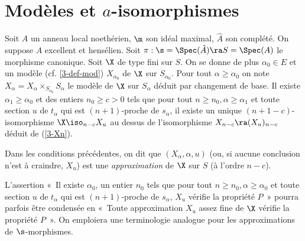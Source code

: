 \documentclass[10pt]{../fichiers-configuration-latex/smfart}
\begin{document}
\section{Modèles et $a$-isomorphismes}
\begin{theoreme}[Approximation]\label{3-theo} Soit $A$  un
anneau local noethérien, $\m$ son idéal maximal, $\hat A$
son complété. On suppose $A$ excellent et hensélien. Soit
$\pi:{\s}=\Spec(\hat A)\ra S=\Spec(A)$ le morphisme canonique. Soit
$\X$ de type fini sur $S$. On se donne de plus $\alpha_0\in E$
et  un modèle (cf. \ref{3-def-mod}) $X_{\alpha_0}$ de $\X$
sur $S_{\alpha_0}$.  Pour tout $\alpha\geq \alpha_0$ on note
$X_\alpha=X_\alpha\times_{S_{\alpha_0}}S_\alpha$ le modèle de
$\X$ sur $S_\alpha$ déduit par changement de base.  Il existe
$\alpha_1\geq\alpha_0$ et des entiers $n_0\geq c>0$ tels que
pour tout $n\geq n_0,\alpha\geq\alpha_1$ et toute section $u$ de
$t_\alpha$ qui est $(n+1)$-proche de $s_\alpha$, il existe un unique
$(n+1-c)$-isomorphisme $\X\iso_{n-c}X_u$ au dessus de l'isomorphisme
$X_{n-c}\ra (X_u)_{n-c}$ déduit de (\ref{3-Xn}).\end{theoreme}


\begin{definition}\label{3-rem} Dans les conditions précédentes,
on dit que $(X_\alpha,\alpha,u)$ (ou, si aucune conclusion n'est
à craindre, $X_u$) est une \emph{approximation} de $\X$ sur $S$
(à l'ordre $n-c$).  \end{definition}

L'assertion « Il existe $\alpha_0$, un entier  $n_0$ tels
que pour tout $n\geq n_0,\alpha\geq\alpha_0$ et toute section
$u$ de $t_\alpha$ qui est $(n+1)$-proche de $s_\alpha$, $X_u$
vérifie la propriété $P$ » pourra parfois être condensée
en « Toute approximation $X_u$ assez fine de $\X$ vérifie la
propriété $P$ ». On emploiera une terminologie analogue pour
les approximations de ${\s}$-morphismes.
\end{document}
